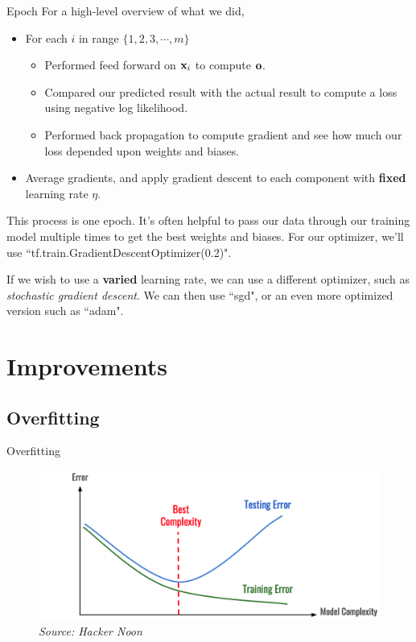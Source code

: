 \documentclass[xcolor=dvipsnames, fontsize=11pt, %
pagesize, %
parskip=half-, t]{beamer}
\begin{document}
\begin{frame}{Epoch}
For a high-level overview of what we did,
\begin{itemize}
\item For each $i$ in range $\{1, 2, 3, \cdots, m\}$ \pause 
\begin{itemize}
\item Performed feed forward on $\bold{x}_i$ to compute $\bold{o}$. \pause 
\item Compared our predicted result with the actual result to compute a loss using negative log likelihood. \pause 
\item Performed back propagation to compute gradient and see how much our loss depended upon weights and biases.  \pause 
\end{itemize}
\item Average gradients, and apply gradient descent to each component with \textbf{fixed} learning rate $\eta$. 
\end{itemize}
This process is one epoch. It's often helpful to pass our data through our training model multiple times to get the best weights and biases. For our optimizer, we'll use ``tf.train.GradientDescentOptimizer(0.2)". \pause

\vspace{0.025\textheight} 
If we wish to use a \textbf{varied} learning rate, we can use a different optimizer, such as \textit{stochastic gradient descent}. We can then use ``sgd", or an even more optimized version such as ``adam".
\end{frame}

\section{Improvements}
\subsection{Overfitting}
\begin{frame}{Overfitting}
\begin{figure}[H]
\includegraphics[scale=0.33]{overfitting.png}
\caption{\textit{Source: Hacker Noon}}
\end{figure}
\end{frame}
\end{document}
